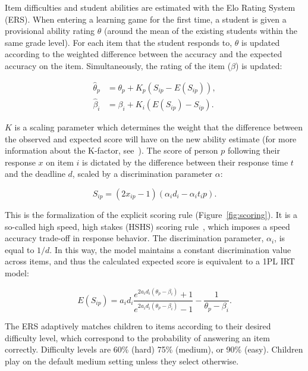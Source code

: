 \documentclass[12pt]{article}
\begin{document}
Item difficulties and student abilities are estimated with the Elo Rating System (ERS). When entering a learning game for the first time, a student is given a provisional ability rating $\theta$ (around the mean of the existing students within the same grade level). For each item that the student responds to, $\theta$ is updated according to the weighted difference between the accuracy and the expected accuracy on the item. Simultaneously, the rating of the item ($\beta$) is updated: 

\begin{align}
    \hat{\theta}_p &= \theta_p + K_p(S_{ip} - E(S_{ip})), \\
    \hat{\beta}_i &= \beta_i + K_i(E(S_{ip}) - S_{ip}).
\end{align}

\noindent $K$ is a scaling parameter which determines the weight that the difference between the observed and expected score will have on the new ability estimate (for more information about the K-factor, see~\textcite{vermeiren2024balancing}). The score of person $p$ following their response $x$ on item $i$ is dictated by the difference between their response time $t$ and the deadline $d$, scaled by a discrimination parameter $\alpha$:

\begin{equation}
    S_{ip} = (2x_{ip} - 1)(\alpha_id_i - \alpha_it_ip).
    \label{eq:scoring}
\end{equation}

\noindent This is the formalization of the explicit scoring rule (Figure~\ref{fig:scoring}). It is a so-called high speed, high stakes (HSHS) scoring rule~\parencite{maris2012speed}, which imposes a speed accuracy trade-off in response behavior. The discrimination parameter, $\alpha_i$, is equal to $1/d$. In this way, the model maintains a constant discrimination value across items, and thus the calculated expected score is equivalent to a 1PL IRT model: 

\begin{equation}
    E(S_{ip}) = a_i d_i \frac{e^{2 a_i d_i (\theta_p - \beta_i)} + 1}{e^{2 a_i d_i (\theta_p - \beta_i)} - 1} - \frac{1}{\theta_p - \beta_i}.
\end{equation}

\noindent The ERS adaptively matches children to items according to their desired difficulty level, which correspond to the probability of answering an item correctly. Difficulty levels are 60\% (hard) 75\% (medium), or 90\% (easy). Children play on the default medium setting unless they select otherwise. 
\end{document}

